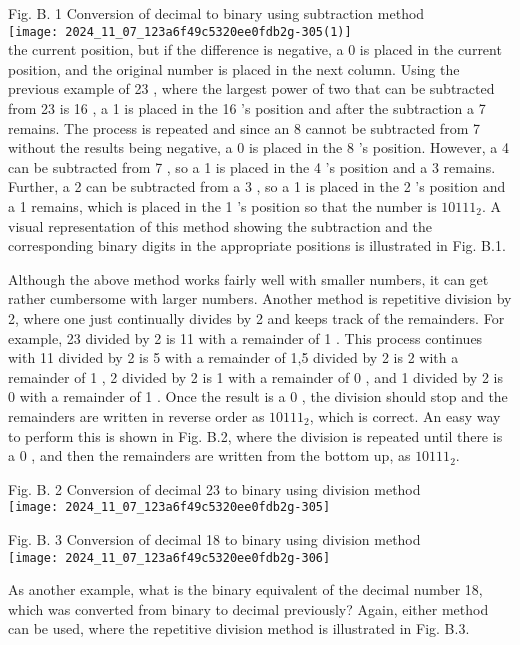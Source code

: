 \documentclass[10pt]{article}
\begin{document}
Fig. B. 1 Conversion of decimal to binary using subtraction method\\
\texttt{[image: 2024\_11\_07\_123a6f49c5320ee0fdb2g-305(1)]}\\
the current position, but if the difference is negative, a 0 is placed in the current position, and the original number is placed in the next column. Using the previous example of 23 , where the largest power of two that can be subtracted from 23 is 16 , a 1 is placed in the 16 's position and after the subtraction a 7 remains. The process is repeated and since an 8 cannot be subtracted from 7 without the results being negative, a 0 is placed in the 8 's position. However, a 4 can be subtracted from 7 , so a 1 is placed in the 4 's position and a 3 remains. Further, a 2 can be subtracted from a 3 , so a 1 is placed in the 2 's position and a 1 remains, which is placed in the 1 's position so that the number is $10111_{2}$. A visual representation of this method showing the subtraction and the corresponding binary digits in the appropriate positions is illustrated in Fig. B.1.

Although the above method works fairly well with smaller numbers, it can get rather cumbersome with larger numbers. Another method is repetitive division by 2, where one just continually divides by 2 and keeps track of the remainders. For example, 23 divided by 2 is 11 with a remainder of 1 . This process continues with 11 divided by 2 is 5 with a remainder of 1,5 divided by 2 is 2 with a remainder of 1 , 2 divided by 2 is 1 with a remainder of 0 , and 1 divided by 2 is 0 with a remainder of 1 . Once the result is a 0 , the division should stop and the remainders are written in reverse order as $10111_{2}$, which is correct. An easy way to perform this is shown in Fig. B.2, where the division is repeated until there is a 0 , and then the remainders are written from the bottom up, as $10111_{2}$.

Fig. B. 2 Conversion of decimal 23 to binary using division method\\
\texttt{[image: 2024\_11\_07\_123a6f49c5320ee0fdb2g-305]}

Fig. B. 3 Conversion of decimal 18 to binary using division method\\
\texttt{[image: 2024\_11\_07\_123a6f49c5320ee0fdb2g-306]}

As another example, what is the binary equivalent of the decimal number 18, which was converted from binary to decimal previously? Again, either method can be used, where the repetitive division method is illustrated in Fig. B.3.
\end{document}
